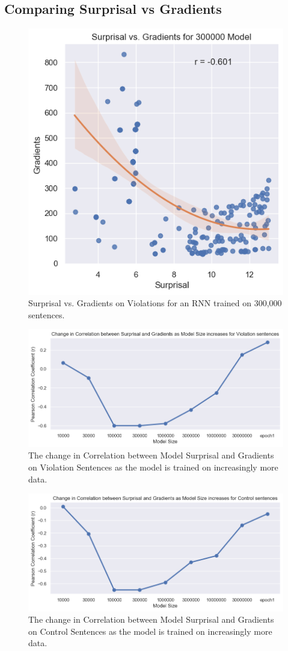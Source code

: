\documentclass{IEEEtran}
\begin{document}
\subsection{Comparing Surprisal vs Gradients}
\begin{figure}
    \centering
    \includegraphics[width=.45\textwidth]{violations_surprisal_vs_gradients/300000.png}
    \caption{Surprisal vs. Gradients on Violations for an RNN trained on 300,000 sentences.}
    \label{fig:300000_surprisal_vs_gradients}
\end{figure}

\begin{figure}
    \centering
    \includegraphics[width=.9\textwidth]{correlation_change/violations_surprisal_vs_gradients.png}
    \caption{The change in Correlation between Model Surprisal and Gradients on Violation Sentences as the model is trained on increasingly more data.}
    \label{fig:correlation_violations_surprisal_gradients}
\end{figure}
\begin{figure}
    \centering
    \includegraphics[width=.9\textwidth]{correlation_change/control_surprisal_vs_gradients.png}
    \caption{The change in Correlation between Model Surprisal and Gradients on Control Sentences as the model is trained on increasingly more data.}
    \label{fig:correlation_control_surprisal_gradients}
\end{figure}
\end{document}
